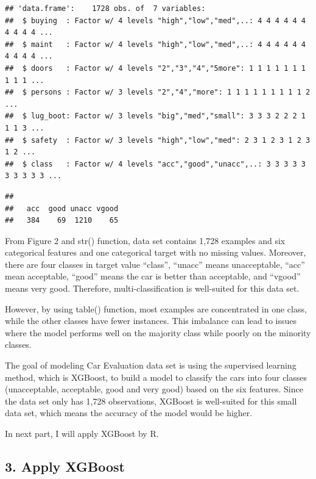 \documentclass[
]{article}
\newenvironment{Shaded}{\begin{snugshade}}{\end{snugshade}}
\newcommand{\FunctionTok}[1]{\textcolor[rgb]{0.13,0.29,0.53}{\textbf{#1}}}
\newcommand{\NormalTok}[1]{#1}
\newcommand{\SpecialCharTok}[1]{\textcolor[rgb]{0.81,0.36,0.00}{\textbf{#1}}}
\begin{document}
\begin{verbatim}
## 'data.frame':    1728 obs. of  7 variables:
##  $ buying  : Factor w/ 4 levels "high","low","med",..: 4 4 4 4 4 4 4 4 4 4 ...
##  $ maint   : Factor w/ 4 levels "high","low","med",..: 4 4 4 4 4 4 4 4 4 4 ...
##  $ doors   : Factor w/ 4 levels "2","3","4","5more": 1 1 1 1 1 1 1 1 1 1 ...
##  $ persons : Factor w/ 3 levels "2","4","more": 1 1 1 1 1 1 1 1 1 2 ...
##  $ lug_boot: Factor w/ 3 levels "big","med","small": 3 3 3 2 2 2 1 1 1 3 ...
##  $ safety  : Factor w/ 3 levels "high","low","med": 2 3 1 2 3 1 2 3 1 2 ...
##  $ class   : Factor w/ 4 levels "acc","good","unacc",..: 3 3 3 3 3 3 3 3 3 3 ...
\end{verbatim}

\begin{Shaded}
\end{Shaded}

\begin{verbatim}
## 
##   acc  good unacc vgood 
##   384    69  1210    65
\end{verbatim}

From Figure 2 and str() function, data set contains 1,728 examples and
six categorical features and one categorical target with no missing
values. Moreover, there are four classes in target value ``class'',
``unacc'' means unacceptable, ``acc'' mean acceptable, ``good'' means
the car is better than acceptable, and ``vgood'' means very good.
Therefore, multi-classification is well-suited for this data set.

However, by using table() function, most examples are concentrated in
one class, while the other classes have fewer instances. This imbalance
can lead to issues where the model performs well on the majority class
while poorly on the minority classes.

The goal of modeling Car Evaluation data set is using the supervised
learning method, which is XGBoost, to build a model to classify the cars
into four classes (unacceptable, acceptable, good and very good) based
on the six features. Since the data set only has 1,728 observations,
XGBoost is well-suited for this small data set, which means the accuracy
of the model would be higher.

In next part, I will apply XGBoost by R.

\subsection{3. Apply XGBoost}\label{apply-xgboost}
\end{document}
